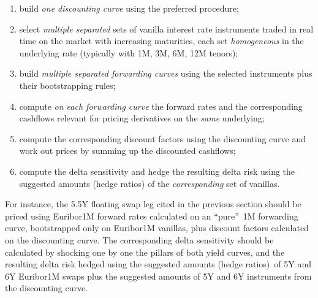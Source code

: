 \documentclass[11pt,reqno]{amsart}
\begin{document}
\begin{enumerate}
\item build \textit{one discounting curve} using the preferred procedure;

\item select \textit{multiple separated} sets of vanilla interest rate instruments traded in real time on the market with increasing maturities, each set \textit{homogeneous} in the underlying rate (typically with 1M, 3M, 6M, 12M tenors);
\item build \textit{multiple separated forwarding curves} using the selected instruments plus their bootstrapping rules;
\item compute \textit{on each forwarding curve} the forward rates and the corresponding cashflows relevant for pricing derivatives on the \textit{same} underlying;
\item compute the corresponding discount factors using the discounting curve and work out prices by summing up the discounted cashflows;
\item compute the delta sensitivity and hedge the resulting delta risk using the suggested amounts (hedge ratios) of the \textit{corresponding} set of vanillas.
\end{enumerate}

For instance, the 5.5Y floating swap leg cited in the previous section should be priced using Euribor1M forward rates calculated on an \textquotedblleft pure\textquotedblright\ 1M forwarding curve, bootstrapped only on Euribor1M vanillas, plus discount factors calculated on the discounting curve. The corresponding delta sensitivity should be calculated by shocking one by one the pillars of both yield curves, and the resulting delta risk hedged using the suggested amounts (hedge ratios)\ of 5Y and 6Y Euribor1M swaps plus the suggested amounts of 5Y and 6Y instruments from the discounting curve.
\end{document}
